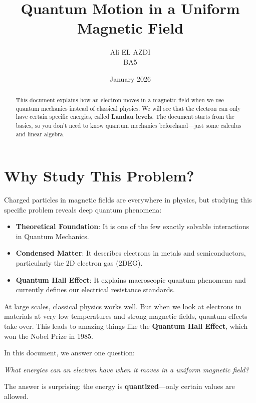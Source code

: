 \documentclass[11pt,a4paper]{article}
\title{\textbf{Quantum Motion in a Uniform Magnetic Field}}
\author{Ali EL AZDI \\ BA5}
\date{January 2026}
\let\oldsection\section
\renewcommand{\section}{\needspace{5\baselineskip}\oldsection}
\theoremstyle{definition}
\theoremstyle{remark}
\begin{document}
\maketitle

\begin{abstract}
This document explains how an electron moves in a magnetic field when we use quantum mechanics instead of classical physics. We will see that the electron can only have certain specific energies, called \textbf{Landau levels}. The document starts from the basics, so you don't need to know quantum mechanics beforehand---just some calculus and linear algebra.
\end{abstract}
\newpage
\tableofcontents
\newpage

\section{Why Study This Problem?}

Charged particles in magnetic fields are everywhere in physics, but studying this specific problem reveals deep quantum phenomena:
\begin{itemize}
    \item \textbf{Theoretical Foundation}: It is one of the few exactly solvable interactions in Quantum Mechanics.
    \item \textbf{Condensed Matter}: It describes electrons in metals and semiconductors, particularly the 2D electron gas (2DEG).
    \item \textbf{Quantum Hall Effect}: It explains macroscopic quantum phenomena and currently defines our electrical resistance standards.
\end{itemize}

At large scales, classical physics works well. But when we look at electrons in materials at very low temperatures and strong magnetic fields, quantum effects take over. This leads to amazing things like the \textbf{Quantum Hall Effect}, which won the Nobel Prize in 1985.

In this document, we answer one question:

\begin{center}
\textit{What energies can an electron have when it moves in a uniform magnetic field?}
\end{center}

The answer is surprising: the energy is \textbf{quantized}---only certain values are allowed.
\end{document}
